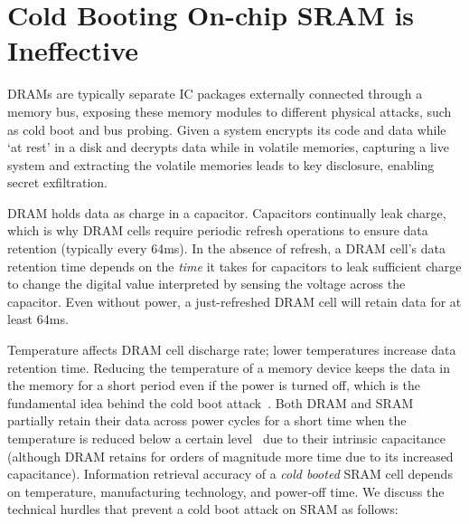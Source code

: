 \section{Cold Booting On-chip SRAM is Ineffective}
\label{sec_motivation}

DRAMs are typically separate IC packages externally connected through a memory bus, exposing these memory modules to different physical attacks, such as cold boot and bus probing. 
Given a system encrypts its code and data while `at rest' in a disk and decrypts data while in volatile memories, capturing a live system and extracting the volatile memories leads to key disclosure, enabling secret exfiltration. 


DRAM holds data as charge in a capacitor.
Capacitors continually leak charge, which is why DRAM cells require periodic refresh operations to ensure data retention (typically every 64ms).
In the absence of refresh, a DRAM cell's data retention time depends on the \textit{time} it takes for capacitors to leak sufficient charge to change the digital value interpreted by sensing the voltage across the capacitor.
Even without power, a just-refreshed DRAM cell will retain data for at least 64ms.

Temperature affects DRAM cell discharge rate; lower temperatures increase data retention time. 
Reducing the temperature of a memory device keeps the data in the memory for a short period even if the power is turned off, which is the fundamental idea behind the cold boot attack~\cite{halderman2009lest}. 
Both DRAM and SRAM  partially retain their data across power cycles for a short time when the temperature is reduced below a certain level~\cite{anagnostopoulos2018low, anagnostopoulos2019attacking,halderman2009lest} due to their intrinsic capacitance (although DRAM retains for orders of magnitude more time due to its increased capacitance).
Information retrieval accuracy of a \textit{cold booted} SRAM cell depends on temperature, manufacturing technology, and power-off time.
We discuss the technical hurdles that prevent a cold boot attack on SRAM as follows:
 

